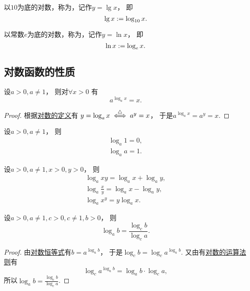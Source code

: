以\(10\)为底的对数，称为，记作\(y = \lg x\)，
即\begin{equation}
	\lg x := \log_{10} x.
\end{equation}

以常数\(e\)为底的对数，称为，记作\(y = \ln x\)，
即\begin{equation}
	\ln x := \log_e x.
\end{equation}

\subsection{对数函数的性质}
\begin{proposition}[对数恒等式]
设\(a>0,a\neq1\)，
则对\(\forall x>0\)
有\begin{equation}\label{equation:函数.对数恒等式}
	a^{\log_a x} = x.
\end{equation}
\begin{proof}
根据\hyperref[equation:函数.对数的定义]{对数的定义}有
\(y = \log_a x
\overset{\triangle}{\iff}
a^y = x\)，
于是\(a^{\log_a x} = a^y = x\).
\end{proof}
\end{proposition}

\begin{theorem}
设\(a>0,a\neq1\)，
则\begin{gather}
	\log_a 1 = 0, \\
	\log_a a = 1.
\end{gather}
\end{theorem}

\begin{theorem}[对数的运算法则]
设\(a>0,a\neq1,x>0,y>0\)，
则\begin{gather}
	\log_a xy = \log_a x + \log_a y, \\
	\log_a \frac{x}{y} = \log_a x - \log_a y, \\
	\log_a x^y = y \log_a x.
		\label{equation:函数.对数的基本运算法则3}
\end{gather}
\end{theorem}

\begin{theorem}[换底公式]
设\(a>0,a\neq1,c>0,c\neq1,b>0\)，
则\begin{equation}\label{equation:函数.换底公式}
	\log_a b = \frac{\log_c b}{\log_c a}.
\end{equation}
\begin{proof}
由\hyperref[equation:函数.对数恒等式]{对数恒等式}有\(b = a^{\log_a b}\)，
于是\(\log_c b
= \log_c a^{\log_a b}\).
又由有\hyperref[equation:函数.对数的基本运算法则3]{对数的运算法则}有\[
	\log_c a^{\log_a b} = \log_a b \cdot \log_c a,
\]
所以\(\log_a b = \frac{\log_c b}{\log_c a}\).
\end{proof}
\end{theorem}


